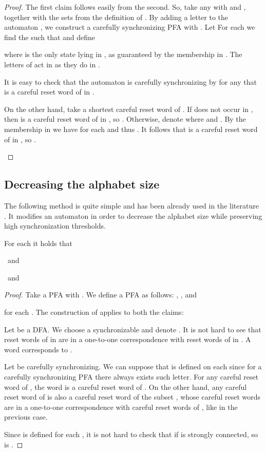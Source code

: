 \documentclass{ws-ijmpc}
\begin{document}
\begin{proof}
The first claim follows easily from the second. So, take any 
with  and , together
with the sets  from the definition
of . By adding a letter  to the
automaton , we construct a carefully synchronizing PFA 
with . Let 
For each  we find the  such that 
and define 

where  is the only state lying in , as guaranteed
by the membership in . The letters of 
act in  as they do in .
\begin{itemlist}
\item It is easy to check that the automaton  is carefully synchronizing
by  for any  that is a careful reset
word of  in .
\item On the other hand, take a shortest careful reset word  of .
If  does not occur in , then  is a careful reset
word of  in , so .
Otherwise, denote  where 
and . By the membership in 
we have  for
each  and thus .
It follows that  is a careful reset word of  in ,
so .
\end{itemlist}
\end{proof}

\subsection{Decreasing the alphabet size}

The following method is quite simple and has been already used in
the literature \citep{BER4}. It modifies an automaton in order to
decrease the alphabet size while preserving high synchronization thresholds. 
\begin{lemma}
\label{lem: bin}For each  it holds that\end{lemma}
\begin{romanlist}
\item 
~and~ 
\item 
~and~ \end{romanlist}
\begin{proof}
Take a PFA  with .
We define a PFA  as follows:
, ,
and

for each . The construction of  applies to both
the claims:
\begin{romanlist}
\item Let  be a DFA. We choose a synchronizable 
and denote . It is not hard
to see that reset words of  in  are in a one-to-one correspondence
with reset words of  in . A word 
corresponds to . 
\item Let  be carefully synchronizing. We can suppose that 
is defined on each  since for a carefully synchronizing
PFA there always exists such letter. For any careful reset word 
of , the word 
is a careful reset word of . On the other hand, any careful reset
word of  is also a careful reset word of the subset ,
whose careful reset words are in a one-to-one correspondence with
careful reset words of , like in the previous case.
\end{romanlist}
Since  is defined
for each , it is not hard to check that if  is strongly
connected, so is .
\end{proof}
\end{document}
